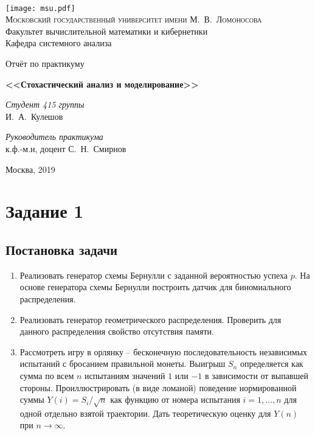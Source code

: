 \documentclass[oneside, final, 12pt]{article}
\begin{document}
\thispagestyle{empty}

\begin{center}
\ \vspace{-3cm}

\texttt{[image: msu.pdf]}\\
{\scshape Московский государственный университет имени М.~В.~Ломоносова}\\
Факультет вычислительной математики и кибернетики\\
Кафедра системного анализа

\vfill

{\LARGE Отчёт по практикуму}

\vspace{1cm}

{\Huge\bfseries <<Стохастический анализ и моделирование>>}
\end{center}

\vspace{1cm}

\begin{flushright}
    \large
    \textit{Студент 415 группы}\\
    И.~А.~Кулешов
    \vspace{5mm}
    
    \textit{Руководитель практикума}\\
    к.ф.-м.н, доцент С.~Н.~Смирнов
\end{flushright}

\vfill

\begin{center}
Москва, 2019
\end{center}

\newpage
\tableofcontents

\newpage
\section{Задание 1}

\subsection{Постановка задачи}
    \begin{enumerate} 
        \item Реализовать генератор схемы Бернулли с заданной вероятностью успеха $p$. 
        		На основе генератора схемы Бернулли построить датчик для биномиального распределения.
        \item Реализовать генератор геометрического распределения. 
        		Проверить для данного распределения свойство отсутствия памяти.
        \item Рассмотреть игру в орлянку -- бесконечную последовательность независимых испытаний
			 с бросанием правильной монеты. Выигрыш $S_n$ определяется как сумма по
			всем $n$ испытаниям значений $1$ или $-1$ в зависимости от выпавшей стороны.
			Проиллюстрировать (в виде ломаной) поведение нормированной суммы $Y(i) = S_i/\sqrt{n}$
			как функцию от номера испытания $i = 1,\ldots, n$ для одной отдельно взятой траектории. 
			Дать теоретическую оценку для $Y(n)$ при $n\rightarrow\infty$.
    \end{enumerate}
\end{document}
